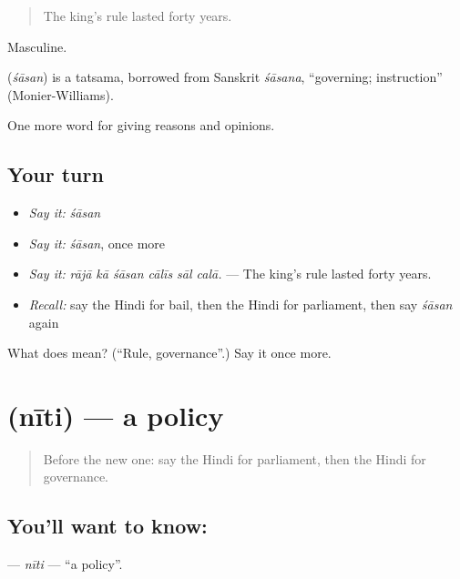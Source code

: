 \begin{quote}
The king's rule lasted forty years.
\end{quote}

Masculine.

\begin{cousinweb}
\textbf{} (\emph{śāsan}) is a tatsama, borrowed from Sanskrit \emph{śāsana}, \textquotedblleft{}governing; instruction\textquotedblright{} (Monier-Williams).
\end{cousinweb}

\begin{grammarlens}[title={What you've built}]
One more word for giving reasons and opinions.
\end{grammarlens}

\subsection*{Your turn}
\begin{itemize}
\raggedright
  \item \emph{Say it:} \emph{śāsan}
  \item \emph{Say it:} \emph{śāsan}, once more
  \item \emph{Say it:} \emph{rājā kā śāsan cālīs sāl calā.} — The king's rule lasted forty years.
  \item \emph{Recall:} say the Hindi for bail, then the Hindi for parliament, then say \emph{śāsan} again
\end{itemize}

\begin{tcolorbox}[breakable,colback=teal!4,colframe=teal!35!black,title={Before you move on}]
What does  mean? (\textquotedblleft{}Rule, governance\textquotedblright{}.) Say it once more.
\end{tcolorbox}
\section[\texorpdfstring{\hi{नीति} (nīti)}{नीति (nīti)}]{ (nīti) — a policy}

\label{lesson:HI-C353-niti}



\begin{quote}
Before the new one: say the Hindi for parliament, then the Hindi for governance.
\end{quote}

\subsection*{You'll want to know: }
\textbf{} — \emph{nīti} — \textquotedblleft{}a policy\textquotedblright{}.

